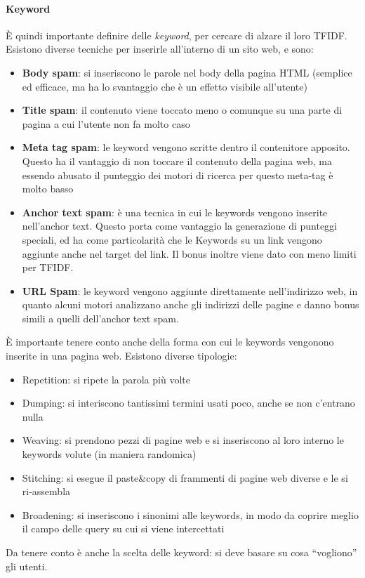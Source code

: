 \paragraph*{Keyword}\`E quindi importante definire delle \textit{keyword}, per cercare di alzare il loro TFIDF. Esistono diverse tecniche per inserirle all'interno di un sito web, e sono:
\begin{itemize}

\item \textbf{Body spam}: si inseriscono le parole nel body della pagina HTML (semplice ed efficace, ma ha lo svantaggio che \`e un effetto visibile all'utente)
\item \textbf{Title spam}: il contenuto viene toccato meno o comunque su una parte di pagina a cui l'utente non fa molto caso
\item \textbf{Meta tag spam}: le keyword vengono scritte dentro il contenitore apposito. Questo ha il vantaggio di non toccare il contenuto della pagina web, ma essendo abusato il punteggio dei motori di ricerca per questo meta-tag \`e molto basso
\item \textbf{Anchor text spam}: \`e una tecnica in cui le keywords vengono inserite nell'anchor text. Questo porta come vantaggio la generazione di punteggi speciali, ed ha come particolarit\`a che le Keywords su un link vengono aggiunte anche nel target del link. Il bonus inoltre viene dato con meno limiti per TFIDF.
\item \textbf{URL Spam}: le keyword vengono aggiunte direttamente nell'indirizzo web, in quanto alcuni motori analizzano anche gli indirizzi delle pagine e danno bonus simili a quelli dell'anchor text spam.

\end{itemize}

\`E importante tenere conto anche della forma con cui le keywords vengonono inserite in una pagina web. Esistono diverse tipologie:
\begin{itemize}

\item Repetition: si ripete la parola pi\`u volte
\item Dumping: si interiscono tantissimi termini usati poco, anche se non c'entrano nulla
\item Weaving: si prendono pezzi di pagine web e si inseriscono al loro interno le keywords volute (in maniera randomica)
\item Stitching: si esegue il paste\&copy di frammenti di pagine web diverse e le si ri-assembla
\item Broadening: si inseriscono i sinonimi alle keywords, in modo da coprire meglio il campo delle query su cui si viene intercettati

\end{itemize}

Da tenere conto \`e anche la scelta delle keyword: si deve basare su cosa ``vogliono'' gli utenti.
